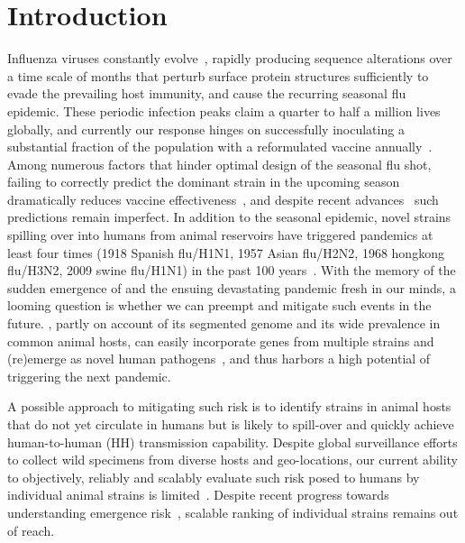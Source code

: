 \documentclass[onecolumn, compsoc,10pt]{IEEEtran}
\begin{document}
\vspace{10pt}
\section*{Introduction}
Influenza viruses constantly evolve~\cite{dos2016influenza},  rapidly producing  sequence alterations over a time scale of months  that  perturb surface protein structures sufficiently to evade the prevailing host immunity, and cause the  recurring seasonal flu epidemic. These periodic  infection peaks claim a quarter to half a million lives~\cite{huddleston2020integrating} globally,  and currently our response hinges on  successfully inoculating a substantial fraction of the  population with a  reformulated  vaccine annually~\cite{boni2008vaccination,dos2016influenza}.  Among numerous factors that hinder optimal design of the seasonal flu shot, failing to correctly predict the dominant strain in the upcoming season dramatically reduces vaccine effectiveness~\cite{tricco2013comparing}, and despite  recent advances~\cite{neher2014predicting,huddleston2020integrating} such predictions remain imperfect. In addition to  the seasonal  epidemic, novel \infl strains spilling over into humans from animal reservoirs have triggered  pandemics  at least four times (1918 Spanish flu/H1N1, 1957 Asian flu/H2N2, 1968 hongkong flu/H3N2, 2009 swine flu/H1N1) in the past 100 years~\cite{shao2017evolution}. With the memory of the  sudden emergence of \cov and the ensuing devastating pandemic fresh in our minds, a looming question  is whether we can  preempt and mitigate such events in the future.  \infl,  partly on account of its segmented genome and its wide prevalence in common animal hosts, can easily incorporate genes from multiple strains and (re)emerge as novel human pathogens~\cite{reid2003origin,vergara2014ns}, and   thus harbors  a high potential  of triggering the next  pandemic.



A possible approach to mitigating such risk is to identify  strains in animal hosts that do not yet circulate in humans but is likely to spill-over and quickly achieve human-to-human (HH) transmission capability. Despite global surveillance efforts to  collect wild specimens from diverse hosts and geo-locations, our  current ability to objectively, reliably and scalably  evaluate such risk posed to  humans by  individual animal  strains  is  limited~\cite{wille2021accurately}. Despite recent progress towards understanding emergence risk~\cite{pulliam2009ability,grewelle2020larger,grange2021ranking}, scalable ranking of individual strains remains out of reach.
\end{document}
